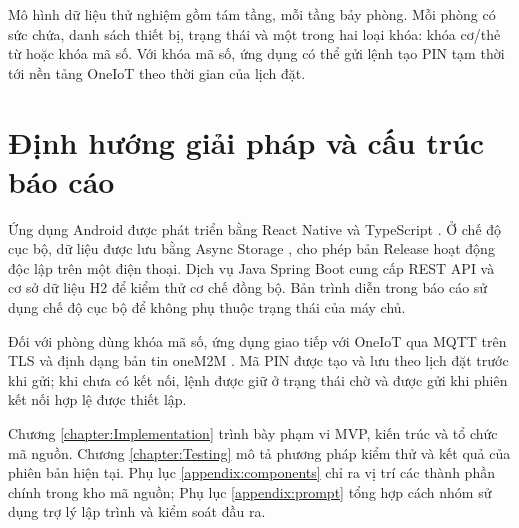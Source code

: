 Mô hình dữ liệu thử nghiệm gồm tám tầng, mỗi tầng bảy phòng. Mỗi phòng có sức chứa, danh sách thiết bị, trạng thái và một trong hai loại khóa: khóa cơ/thẻ từ hoặc khóa mã số. Với khóa mã số, ứng dụng có thể gửi lệnh tạo PIN tạm thời tới nền tảng OneIoT theo thời gian của lịch đặt.

\section{Định hướng giải pháp và cấu trúc báo cáo}

Ứng dụng Android được phát triển bằng React Native và TypeScript \cite{reactnative}. Ở chế độ cục bộ, dữ liệu được lưu bằng Async Storage \cite{asyncstorage}, cho phép bản Release hoạt động độc lập trên một điện thoại. Dịch vụ Java Spring Boot \cite{springboot} cung cấp REST API và cơ sở dữ liệu H2 để kiểm thử cơ chế đồng bộ. Bản trình diễn trong báo cáo sử dụng chế độ cục bộ để không phụ thuộc trạng thái của máy chủ.

Đối với phòng dùng khóa mã số, ứng dụng giao tiếp với OneIoT qua MQTT trên TLS \cite{mqtt} và định dạng bản tin oneM2M \cite{onem2m}. Mã PIN được tạo và lưu theo lịch đặt trước khi gửi; khi chưa có kết nối, lệnh được giữ ở trạng thái chờ và được gửi khi phiên kết nối hợp lệ được thiết lập.

Chương \ref{chapter:Implementation} trình bày phạm vi MVP, kiến trúc và tổ chức mã nguồn. Chương \ref{chapter:Testing} mô tả phương pháp kiểm thử và kết quả của phiên bản hiện tại. Phụ lục \ref{appendix:components} chỉ ra vị trí các thành phần chính trong kho mã nguồn; Phụ lục \ref{appendix:prompt} tổng hợp cách nhóm sử dụng trợ lý lập trình và kiểm soát đầu ra.
